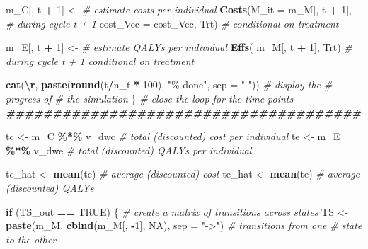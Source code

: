 \documentclass[
]{article}
\newenvironment{Shaded}{\begin{snugshade}}{\end{snugshade}}
\newcommand{\AttributeTok}[1]{\textcolor[rgb]{0.13,0.29,0.53}{#1}}
\newcommand{\CommentTok}[1]{\textcolor[rgb]{0.56,0.35,0.01}{\textit{#1}}}
\newcommand{\ConstantTok}[1]{\textcolor[rgb]{0.56,0.35,0.01}{#1}}
\newcommand{\ControlFlowTok}[1]{\textcolor[rgb]{0.13,0.29,0.53}{\textbf{#1}}}
\newcommand{\DecValTok}[1]{\textcolor[rgb]{0.00,0.00,0.81}{#1}}
\newcommand{\DocumentationTok}[1]{\textcolor[rgb]{0.56,0.35,0.01}{\textbf{\textit{#1}}}}
\newcommand{\FunctionTok}[1]{\textcolor[rgb]{0.13,0.29,0.53}{\textbf{#1}}}
\newcommand{\NormalTok}[1]{#1}
\newcommand{\OtherTok}[1]{\textcolor[rgb]{0.56,0.35,0.01}{#1}}
\newcommand{\SpecialCharTok}[1]{\textcolor[rgb]{0.81,0.36,0.00}{\textbf{#1}}}
\newcommand{\StringTok}[1]{\textcolor[rgb]{0.31,0.60,0.02}{#1}}
\begin{document}
\begin{Shaded}
\begin{Highlighting}[]
\NormalTok{    m\_C[, t }\SpecialCharTok{+} \DecValTok{1}\NormalTok{] }\OtherTok{\textless{}{-}}                    \CommentTok{\# estimate costs per individual}
      \FunctionTok{Costs}\NormalTok{(}\AttributeTok{M\_it =}\NormalTok{ m\_M[, t }\SpecialCharTok{+} \DecValTok{1}\NormalTok{],       }\CommentTok{\# during cycle t + 1 }
            \AttributeTok{cost\_Vec =}\NormalTok{ cost\_Vec, Trt)  }\CommentTok{\# conditional on treatment}
                                          
                                          
\NormalTok{    m\_E[, t }\SpecialCharTok{+} \DecValTok{1}\NormalTok{] }\OtherTok{\textless{}{-}}             \CommentTok{\# estimate QALYs per individual}
      \FunctionTok{Effs}\NormalTok{( m\_M[, t }\SpecialCharTok{+} \DecValTok{1}\NormalTok{], Trt)  }\CommentTok{\# during cycle t + 1 conditional on treatment}
                                  
    
    \FunctionTok{cat}\NormalTok{(}\StringTok{\textquotesingle{}}\SpecialCharTok{\textbackslash{}r}\StringTok{\textquotesingle{}}\NormalTok{, }\FunctionTok{paste}\NormalTok{(}\FunctionTok{round}\NormalTok{(t}\SpecialCharTok{/}\NormalTok{n\_t }\SpecialCharTok{*} \DecValTok{100}\NormalTok{), }\StringTok{"\% done"}\NormalTok{, }\AttributeTok{sep =} \StringTok{" "}\NormalTok{)) }\CommentTok{\# display the }
                                                              \CommentTok{\# progress of }
                                                              \CommentTok{\# the simulation}
\NormalTok{  \} }\CommentTok{\# close the loop for the time points }
  \DocumentationTok{\#\#\#\#\#\#\#\#\#\#\#\#\#\#\#\#\#\#\#\#\#\#\#\#\#\#\#\#\#\#\#\#\#\#\#\#\#\#}
 
   
\NormalTok{  tc }\OtherTok{\textless{}{-}}\NormalTok{ m\_C }\SpecialCharTok{\%*\%}\NormalTok{ v\_dwc       }\CommentTok{\# total (discounted) cost per individual}
\NormalTok{  te }\OtherTok{\textless{}{-}}\NormalTok{ m\_E }\SpecialCharTok{\%*\%}\NormalTok{ v\_dwe       }\CommentTok{\# total (discounted) QALYs per individual }
  
\NormalTok{  tc\_hat }\OtherTok{\textless{}{-}} \FunctionTok{mean}\NormalTok{(tc)        }\CommentTok{\# average (discounted) cost }
\NormalTok{  te\_hat }\OtherTok{\textless{}{-}} \FunctionTok{mean}\NormalTok{(te)        }\CommentTok{\# average (discounted) QALYs}
  
  \ControlFlowTok{if}\NormalTok{ (TS\_out }\SpecialCharTok{==} \ConstantTok{TRUE}\NormalTok{) \{  }\CommentTok{\# create a matrix of transitions across states}
\NormalTok{    TS }\OtherTok{\textless{}{-}} \FunctionTok{paste}\NormalTok{(m\_M, }\FunctionTok{cbind}\NormalTok{(m\_M[, }\SpecialCharTok{{-}}\DecValTok{1}\NormalTok{], }\ConstantTok{NA}\NormalTok{), }\AttributeTok{sep =} \StringTok{"{-}\textgreater{}"}\NormalTok{) }\CommentTok{\# transitions from one   }
    \CommentTok{\# state to the other}
    

\end{Highlighting}
\end{Shaded}
\end{document}
